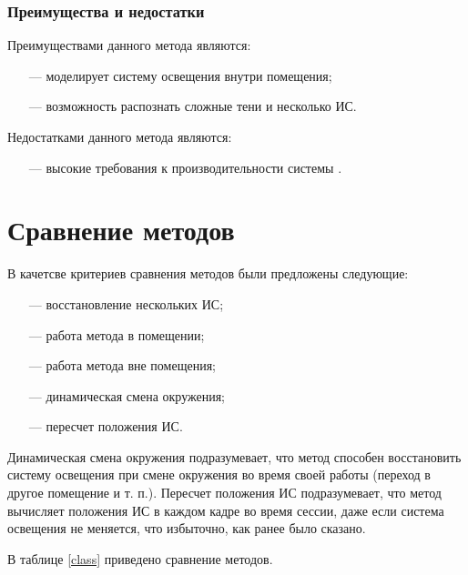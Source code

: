 \subsubsection*{Преимущества и недостатки}

Преимуществами данного метода являются:

\begin{itemize}
	\item[---] моделирует систему освещения внутри помещения;
	\item[---] возможность распознать сложные тени и несколько ИС.
\end{itemize}

Недостатками данного метода являются:

\begin{itemize}
	\item[---] высокие требования к производительности системы \cite{tras}.
\end{itemize}

\section{Сравнение методов}

В качетсве критериев сравнения методов были предложены следующие:

\begin{itemize}
	\item[---] восстановление нескольких ИС;
	\item[---] работа метода в помещении;
	\item[---] работа метода вне помещения;
	\item[---] динамическая смена окружения;
	\item[---] пересчет положения ИС.
\end{itemize}

Динамическая смена окружения подразумевает, что метод способен восстановить систему освещения при смене окружения во время своей работы (переход в другое помещение и т. п.). Пересчет положения ИС подразумевает, что метод вычисляет положения ИС в каждом кадре во время сессии, даже если система освещения не меняется, что избыточно, как ранее было сказано.

В таблице \ref{class} приведено сравнение методов.

